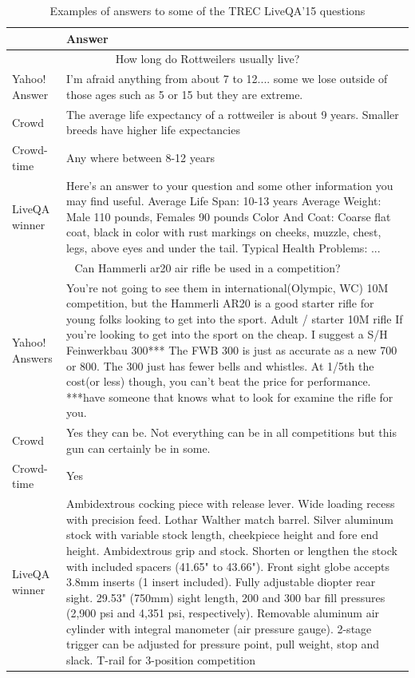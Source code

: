 \documentclass[11pt,letterpaper]{article}
\begin{document}
\begin{table}[h!t]
\centering
\caption{Examples of answers to some of the TREC LiveQA'15 questions}
\begin{tabular}{| p{3cm} | p{12.5cm} |}
\hline
 & Answer \\
\hline
\hline
\multicolumn{2}{|c|}{How long do Rottweilers usually live?} \\
\hline
Yahoo! Answer & I'm afraid anything from about 7 to 12.... some we lose outside of those ages such as 5 or 15 but they are extreme.\\
Crowd & The average life expectancy of a rottweiler is about 9 years. Smaller breeds have higher life expectancies\\
Crowd-time & Any where between 8-12 years\\
LiveQA winner & Here's an answer to your question and some other information you may find useful. Average Life Span: 10-13 years Average Weight: Male 110 pounds, Females 90 pounds Color And Coat: Coarse flat coat, black in color with rust markings on cheeks, muzzle, chest, legs, above eyes and under the tail. Typical Health Problems: ...\\
\hline
\hline
\multicolumn{2}{|c|}{Can Hammerli ar20 air rifle be used in a competition?}\\
\hline
Yahoo! Answers & You're not going to see them in international(Olympic, WC) 10M competition, but the Hammerli AR20 is a good starter rifle for young folks looking to get into the sport. Adult / starter 10M rifle If you're looking to get into the sport on the cheap. I suggest a S/H Feinwerkbau 300*** The FWB 300 is just as accurate as a new 700 or 800. The 300 just has fewer bells and whistles. At 1/5th the cost(or less) though, you can't beat the price for performance. ***have someone that knows what to look for examine the rifle for you.\\
Crowd & Yes they can be. Not everything can be in all competitions but this gun can certainly be in some.\\
Crowd-time & Yes\\
LiveQA winner & Ambidextrous cocking piece with release lever. Wide loading recess with precision feed. Lothar Walther match barrel. Silver aluminum stock with variable stock length, cheekpiece height and fore end height. Ambidextrous grip and stock. Shorten or lengthen the stock with included spacers (41.65" to 43.66"). Front sight globe accepts 3.8mm inserts (1 insert included). Fully adjustable diopter rear sight. 29.53" (750mm) sight length, 200 and 300 bar fill pressures (2,900 psi and 4,351 psi, respectively). Removable aluminum air cylinder with integral manometer (air pressure gauge). 2-stage trigger can be adjusted for pressure point, pull weight, stop and slack. T-rail for 3-position competition\\
\hline
\end{tabular}
\label{table:answer_examples}
\end{table}
\end{document}
